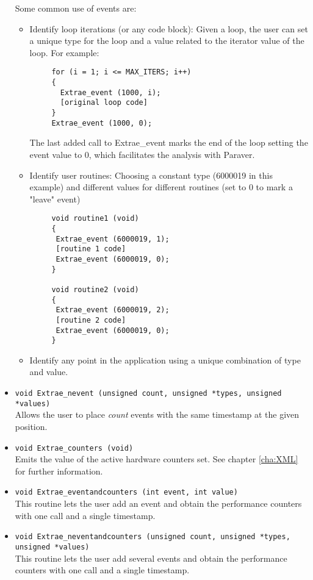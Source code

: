 \begin{itemize}
 Some common use of events are:
  \begin{itemize}
   \item Identify loop iterations (or any code block): Given a loop, the user can set a unique type for the loop and a value related to the iterator value of the loop. For example:
    \begin{verbatim}
     for (i = 1; i <= MAX_ITERS; i++)
     {
       Extrae_event (1000, i);
       [original loop code]
     }
     Extrae_event (1000, 0);
    \end{verbatim}
   The last added call to Extrae\_event marks the end of the loop setting the event value to 0, which facilitates the analysis with Paraver.
   \item Identify user routines: Choosing a constant type (6000019 in this example) and different values for different routines (set to 0 to mark a "leave" event) 
    \begin{verbatim}
     void routine1 (void)
     {
      Extrae_event (6000019, 1);
      [routine 1 code]
      Extrae_event (6000019, 0);
     }

     void routine2 (void)
     {
      Extrae_event (6000019, 2);
      [routine 2 code]
      Extrae_event (6000019, 0);
     }
   \end{verbatim}
   \item Identify any point in the application using a unique combination of type and value.
  \end{itemize}

 \item {\tt void Extrae\_nevent (unsigned count, unsigned *types, unsigned *values)}\\
  Allows the user to place {\em count} events with the same timestamp at the given position.

 \item {\tt void Extrae\_counters (void)}\\
  Emits the value of the active hardware counters set. See chapter \ref{cha:XML} for further information.

 \item {\tt void Extrae\_eventandcounters (int event, int value)}\\
  This routine lets the user add an event and obtain the performance counters with one call and a single timestamp.

 \item {\tt void Extrae\_neventandcounters (unsigned count, unsigned *types, unsigned *values)}\\
  This routine lets the user add several events and obtain the performance counters with one call and a single timestamp.


\end{itemize}
